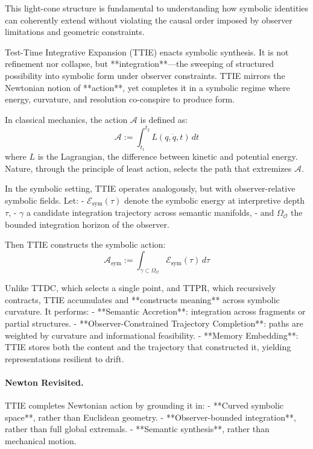 This light-cone structure is fundamental to understanding how symbolic identities can coherently extend without violating the causal order imposed by observer limitations and geometric constraints.

\begin{scholium}
\label{scholium:bk4_tt_integrative_expansion_action}
Test-Time Integrative Expansion (TTIE) enacts symbolic synthesis. It is not refinement nor collapse, but **integration**—the sweeping of structured possibility into symbolic form under observer constraints. TTIE mirrors the Newtonian notion of **action**, yet completes it in a symbolic regime where energy, curvature, and resolution co-conspire to produce form.

In classical mechanics, the action $\mathcal{A}$ is defined as:
\[
\mathcal{A} := \int_{t_1}^{t_2} L(q, \dot{q}, t)\,dt
\]
where $L$ is the Lagrangian, the difference between kinetic and potential energy. Nature, through the principle of least action, selects the path that extremizes $\mathcal{A}$.

In the symbolic setting, TTIE operates analogously, but with observer-relative symbolic fields. Let:
- $\mathcal{E}_{\text{sym}}(\tau)$ denote the symbolic energy at interpretive depth $\tau$,
- $\gamma$ a candidate integration trajectory across semantic manifolds,
- and $\Omega_{\mathcal{O}}$ the bounded integration horizon of the observer.

Then TTIE constructs the symbolic action:
\[
\mathcal{A}_{\text{sym}} := \int_{\gamma \subset \Omega_{\mathcal{O}}} \mathcal{E}_{\text{sym}}(\tau)\,d\tau
\]

Unlike TTDC, which selects a single point, and TTPR, which recursively contracts, TTIE accumulates and **constructs meaning** across symbolic curvature. It performs:
- **Semantic Accretion**: integration across fragments or partial structures.
- **Observer-Constrained Trajectory Completion**: paths are weighted by curvature and informational feasibility.
- **Memory Embedding**: TTIE stores both the content and the trajectory that constructed it, yielding representations resilient to drift.

\paragraph{Newton Revisited.} TTIE completes Newtonian action by grounding it in:
- **Curved symbolic space**, rather than Euclidean geometry.
- **Observer-bounded integration**, rather than full global extremals.
- **Semantic synthesis**, rather than mechanical motion.


\end{scholium}
